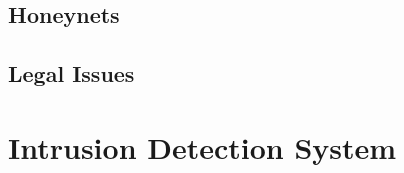 

\subsection{Honeynets}

\cite{Spitzner2003}

\subsection{Legal Issues}

\cite{Spitzner2003}

\section{Intrusion Detection System}
